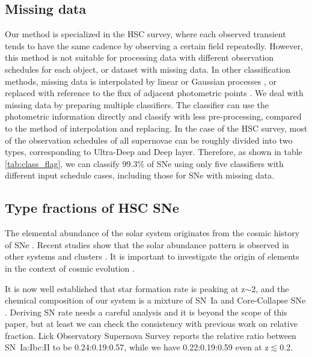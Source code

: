 \documentclass[proof]{pasj01}
\begin{document}
\subsection{Missing data}
%
Our method is specialized in the HSC survey, where each observed transient tends to have the same cadence by observing a certain field repeatedly.
However, this method is not suitable for processing data with different observation schedules for each object, or dataset with missing data.
In other classification methods, missing data is interpolated by linear or Gaussian processes \citep{Lochner_2016,Muthukrishna_2019}, or replaced with reference to the flux of adjacent photometric points \citep{charnock17a}.
We deal with missing data by preparing multiple classifiers.
The classifier can use the photometric information directly and classify with less pre-processing, compared to the method of interpolation and replacing.
In the case of the HSC survey, most of the observation schedules of all supernovae can be roughly divided into two types, corresponding to Ultra-Deep and Deep layer.
Therefore, as shown in table \ref{tab:class_flag}, we can classify 99.3\% of SNe using only five classifiers with different input schedule cases, including those for SNe with missing data.
%
%
\subsection{Type fractions of HSC SNe}
The elemental abundance of the solar system \citep{grevesse98a} originates from the cosmic history of SNe \citep{maraston05a,kobayashi00a}.  
Recent studies show that the solar abundance pattern is observed in other systems \citep{ramirez09a} and clusters \citep{mernier18a}. 
It is important to investigate the origin of elements in the context of cosmic evolution \citep{fukugita04a}. 

It is now well established that star formation rate is peaking at z$\sim$2, and the chemical composition of our system is a mixture of SN~Ia and Core-Collapse SNe \citep{tsujimoto95a,kobayashi11a}.
Deriving SN rate needs a careful analysis \citep{dilday08a,brown19a,frohmaier19a} and it is beyond the scope of this paper, but at least we can check the consistency with previous work on relative fraction.
Lick Observatory Supernova Survey \citep{li11a} reports the relative ratio between SN~Ia:Ibc:II to be 0.24:0.19:0.57, while we have 0.22:0.19:0.59 even at z$\lesssim$0.2. 
\end{document}
